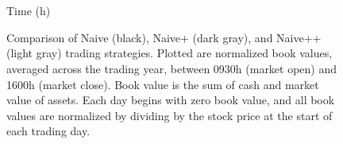 \begin{figure}%
\centering%
\begin{subfigure}[b]{.4\linewidth}%
  \setlength\figureheight{\linewidth}%
  \setlength\figurewidth{\linewidth}%
\end{subfigure}%
\hspace{1.5cm}%
\begin{subfigure}[b]{.4\linewidth}%
  \setlength\figureheight{\linewidth}%
  \setlength\figurewidth{\linewidth}%
\end{subfigure}\\%
\vspace{1cm}%
\begin{subfigure}[b]{.4\linewidth}%
  \setlength\figureheight{\linewidth}%
  \setlength\figurewidth{\linewidth}%
\end{subfigure}%
\hspace{1.5cm}%
\begin{subfigure}[b]{.4\linewidth}%
  \setlength\figureheight{\linewidth}%
  \setlength\figurewidth{\linewidth}%
\end{subfigure}\\%
%
\leavevmode{}\hspace{0pt plus 1filll}\null%

Time (h)

\vspace{1cm}%
\begin{subfigure}{\linewidth}%
  \centering%
\end{subfigure}%
  \caption[Comparison of the naive trading strategies]{Comparison of Naive (black), Naive+ (dark gray), and Naive++ (light gray) trading strategies. Plotted are normalized book values, averaged across the trading year, between 0930h (market open) and 1600h (market close). Book value is the sum of cash and market value of assets. Each day begins with zero book value, and all book values are normalized by dividing by the stock price at the start of each trading day.}\label{fig:comp}%
\end{figure}

